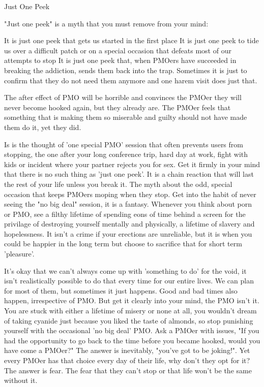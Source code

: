 Just One Peek

"Just one peek" is a myth that you must remove from your mind:

  It is just one peek that gets us started in the first place
  It is just one peek to tide us over a difficult patch or on a special occasion that defeats most of our attempts to stop
  It is just one peek that, when PMOers have succeeded in breaking the addiction, sends them back into the trap. Sometimes it is just to confirm that they do not need them anymore and one harem visit does just that.

The after effect of PMO will be horrible and convinces the PMOer they will never become hooked again, but they already are. The PMOer feels that something that is making them so miserable and guilty should not have made them do it, yet they did.

Is is the thought of 'one special PMO' session that often prevents users from stopping, the one after your long conference trip, hard day at work, fight with kids or incident where your partner rejects you for sex. Get it firmly in your mind that there is no such thing as 'just one peek'. It is a chain reaction that will last the rest of your life unless you break it. The myth about the odd, special occasion that keeps PMOers moping when they stop. Get into the habit of never seeing the "no big deal" session, it is a fantasy. Whenever you think about porn or PMO, see a filthy lifetime of spending eons of time behind a screen for the privilage of destroying yourself mentally and physically, a lifetime of slavery and hopelessness. It isn't a crime if your erections are unreliable, but it is when you could be happier in the long term but choose to sacrifice that for short term 'pleasure'.

It's okay that we can't always come up with 'something to do' for the void, it isn't realistically possible to do that every time for our entire lives. We can plan for most of them, but sometimes it just happens. Good and bad times also happen, irrespective of PMO. But get it clearly into your mind, the PMO isn't it. You are stuck with either a lifetime of misery or none at all, you wouldn't dream of taking cyanide just because you liked the taste of almonds, so stop punishing yourself with the occasional 'no big deal' PMO. Ask a PMOer with issues, "If you had the opportunity to go back to the time before you became hooked, would you have come a PMOer?" The answer is inevitably, "you've got to be joking!". Yet every PMOer has that choice every day of their life, why don't they opt for it? The answer is fear. The fear that they can't stop or that life won't be the same without it.

